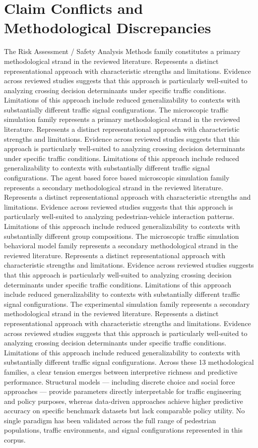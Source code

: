 \documentclass{article}
\begin{document}
\section{Claim Conflicts and Methodological Discrepancies}
The Risk Assessment / Safety Analysis Methods family constitutes a primary methodological strand in the reviewed literature. Represents a distinct representational approach with characteristic strengths and limitations. Evidence across reviewed studies suggests that this approach is particularly well-suited to analyzing crossing decision determinants under specific traffic conditions. Limitations of this approach include reduced generalizability to contexts with substantially different traffic signal configurations. The microscopic traffic simulation family represents a primary methodological strand in the reviewed literature. Represents a distinct representational approach with characteristic strengths and limitations. Evidence across reviewed studies suggests that this approach is particularly well-suited to analyzing crossing decision determinants under specific traffic conditions. Limitations of this approach include reduced generalizability to contexts with substantially different traffic signal configurations. The agent based force based microscopic simulation family represents a secondary methodological strand in the reviewed literature. Represents a distinct representational approach with characteristic strengths and limitations. Evidence across reviewed studies suggests that this approach is particularly well-suited to analyzing pedestrian-vehicle interaction patterns. Limitations of this approach include reduced generalizability to contexts with substantially different group compositions. The microscopic traffic simulation behavioral model family represents a secondary methodological strand in the reviewed literature. Represents a distinct representational approach with characteristic strengths and limitations. Evidence across reviewed studies suggests that this approach is particularly well-suited to analyzing crossing decision determinants under specific traffic conditions. Limitations of this approach include reduced generalizability to contexts with substantially different traffic signal configurations. The experimental simulation family represents a secondary methodological strand in the reviewed literature. Represents a distinct representational approach with characteristic strengths and limitations. Evidence across reviewed studies suggests that this approach is particularly well-suited to analyzing crossing decision determinants under specific traffic conditions. Limitations of this approach include reduced generalizability to contexts with substantially different traffic signal configurations. Across these 13 methodological families, a clear tension emerges between interpretive richness and predictive performance. Structural models — including discrete choice and social force approaches — provide parameters directly interpretable for traffic engineering and policy purposes, whereas data-driven approaches achieve higher predictive accuracy on specific benchmark datasets but lack comparable policy utility. No single paradigm has been validated across the full range of pedestrian populations, traffic environments, and signal configurations represented in this corpus.
\end{document}
